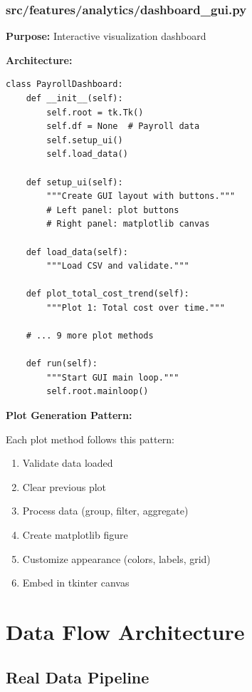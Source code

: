 \subsubsection{src/features/analytics/dashboard\_gui.py}

\textbf{Purpose:} Interactive visualization dashboard

\textbf{Architecture:}

\begin{lstlisting}[style=pythonstyle, caption=Dashboard Class Structure]
class PayrollDashboard:
    def __init__(self):
        self.root = tk.Tk()
        self.df = None  # Payroll data
        self.setup_ui()
        self.load_data()
    
    def setup_ui(self):
        """Create GUI layout with buttons."""
        # Left panel: plot buttons
        # Right panel: matplotlib canvas
    
    def load_data(self):
        """Load CSV and validate."""
    
    def plot_total_cost_trend(self):
        """Plot 1: Total cost over time."""
    
    # ... 9 more plot methods
    
    def run(self):
        """Start GUI main loop."""
        self.root.mainloop()
\end{lstlisting}

\textbf{Plot Generation Pattern:}

Each plot method follows this pattern:
\begin{enumerate}
    \item Validate data loaded
    \item Clear previous plot
    \item Process data (group, filter, aggregate)
    \item Create matplotlib figure
    \item Customize appearance (colors, labels, grid)
    \item Embed in tkinter canvas
\end{enumerate}

\section{Data Flow Architecture}

\subsection{Real Data Pipeline}

